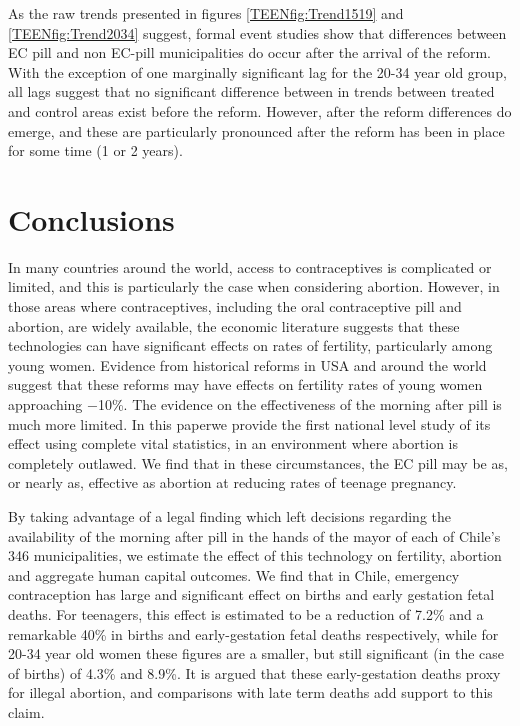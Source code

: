 As the raw trends presented in figures \ref{TEENfig:Trend1519} and 
\ref{TEENfig:Trend2034} suggest, formal event studies show that differences 
between EC pill and non EC-pill municipalities do occur after the arrival of the
reform.  With the exception of one marginally significant lag for the 20-34 year
old group, all lags suggest that no significant difference between in trends
between treated and control areas exist before the reform.  However, after the
reform differences do emerge, and these are particularly pronounced after the
reform has been in place for some time (1 or 2 years).

\section{Conclusions}
\label{TEENscn:conclusion}
In many countries around the world, access to contraceptives is complicated or
limited, and this is particularly the case when considering abortion.  However,
in those areas where contraceptives, including the oral contraceptive pill and 
abortion, are widely available, the economic literature suggests that these
technologies can have significant effects on rates of fertility, particularly
among young women.  Evidence from historical reforms in USA and around the world
suggest that these reforms may have effects on fertility rates of young women 
approaching $-$10\%.  The evidence on the effectiveness of the morning after pill 
is much more limited.  In this paperwe provide the first national level study of 
its effect using complete vital statistics, in an environment where abortion is 
completely outlawed. We find that in these circumstances, the EC pill may be as, 
or nearly as, effective as abortion at reducing rates of teenage pregnancy.

By taking advantage of a legal finding which left decisions regarding the 
availability of the morning after pill in the hands of the mayor of each of
Chile's 346 municipalities, we estimate the effect of this technology on 
fertility, abortion and aggregate human capital outcomes. We find that in Chile,
emergency contraception has large and significant effect on births and early 
gestation fetal deaths.  For teenagers, this effect is estimated to be a
reduction of 7.2\% and a remarkable 40\% in births and early-gestation fetal 
deaths respectively, while for 20-34 year old women these figures are a smaller, 
but still significant (in the case of births) of 4.3\% and 8.9\%.  It is argued 
that these early-gestation deaths proxy for illegal abortion, and comparisons 
with late term deaths add support to this claim.

